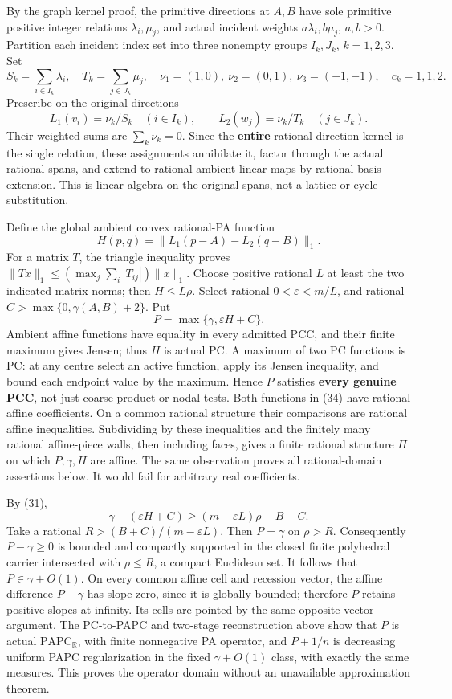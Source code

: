 \documentclass[
  11pt,
]{article}
\begin{document}
By the graph kernel proof, the primitive directions at \(A,B\) have sole
primitive positive integer relations \(\lambda_i,\mu_j\), and actual
incident weights \(a\lambda_i,b\mu_j\), \(a,b>0\). Partition each
incident index set into three nonempty groups \(I_k,J_k\), \(k=1,2,3\).
Set \[
 S_k=\sum_{i\in I_k}\lambda_i,\quad T_k=\sum_{j\in J_k}\mu_j,
 \quad\nu_1=(1,0),\ \nu_2=(0,1),\ \nu_3=(-1,-1),\quad c_k=1,1,2.
\] Prescribe on the original directions \[
L_1(v_i)=\nu_k/S_k\quad(i\in I_k),\qquad
L_2(w_j)=\nu_k/T_k\quad(j\in J_k).                            \tag{32}
\] Their weighted sums are \(\sum_k\nu_k=0\). Since the \textbf{entire}
rational direction kernel is the single relation, these assignments
annihilate it, factor through the actual rational spans, and extend to
rational ambient linear maps by rational basis extension. This is linear
algebra on the original spans, not a lattice or cycle substitution.

Define the global ambient convex rational-PA function \[
             H(p,q)=\|L_1(p-A)-L_2(q-B)\|_1.                 \tag{33}
\] For a matrix \(T\), the triangle inequality proves
\(\|Tx\|_1\leq(\max_j\sum_i|T_{ij}|)\|x\|_1\). Choose positive rational
\(L\) at least the two indicated matrix norms; then \(H\leq L\rho\).
Select rational \(0<\varepsilon<m/L\), and rational
\(C>\max\{0,\gamma(A,B)+2\}\). Put \[
                  P=\max\{\gamma,\varepsilon H+C\}.          \tag{34}
\] Ambient affine functions have equality in every admitted PCC, and
their finite maximum gives Jensen; thus \(H\) is actual PC. A maximum of
two PC functions is PC: at any centre select an active function, apply
its Jensen inequality, and bound each endpoint value by the maximum.
Hence \(P\) satisfies \textbf{every genuine PCC}, not just coarse
product or nodal tests. Both functions in (34) have rational affine
coefficients. On a common rational structure their comparisons are
rational affine inequalities. Subdividing by these inequalities and the
finitely many rational affine-piece walls, then including faces, gives a
finite rational structure \(\Pi\) on which \(P,\gamma,H\) are affine.
The same observation proves all rational-domain assertions below. It
would fail for arbitrary real coefficients.

By (31), \[
 \gamma-(\varepsilon H+C)\geq(m-\varepsilon L)\rho-B-C.
\] Take a rational \(R>(B+C)/(m-\varepsilon L)\). Then \(P=\gamma\) on
\(\rho>R\). Consequently \(P-\gamma\geq0\) is bounded and compactly
supported in the closed finite polyhedral carrier intersected with
\(\rho\leq R\), a compact Euclidean set. It follows that
\(P\in\gamma+O(1)\). On every common affine cell and recession vector,
the affine difference \(P-\gamma\) has slope zero, since it is globally
bounded; therefore \(P\) retains positive slopes at infinity. Its cells
are pointed by the same opposite-vector argument. The PC-to-PAPC and
two-stage reconstruction above show that \(P\) is actual
\(\mathrm{PAPC}_{\mathbb{R}}\), with finite nonnegative PA operator, and
\(P+1/n\) is decreasing uniform PAPC regularization in the fixed
\(\gamma+O(1)\) class, with exactly the same measures. This proves the
operator domain without an unavailable approximation theorem.
\end{document}
